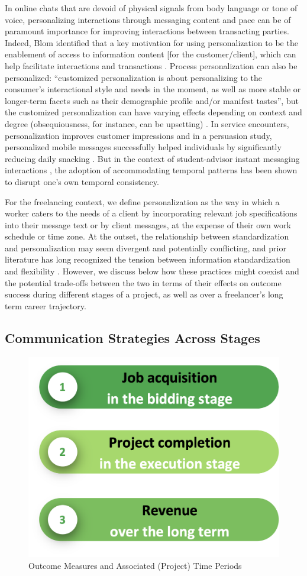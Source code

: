 In online chats that are devoid of physical signals from body language or tone of voice, personalizing interactions through messaging content and pace can be of paramount importance for improving interactions between transacting parties. Indeed, Blom identified that a key motivation for using personalization to be the enablement of access to information content [for the customer/client], which can help facilitate interactions and transactions \cite{Blom_2000}. Process personalization can also be personalized{:} ``customized personalization is about personalizing to the consumer's interactional style and needs in the moment, as well as more stable or longer-term facets such as their demographic profile and/or manifest tastes'', but the customized personalization can have varying effects depending on context and degree (obsequiousness, for instance, can be upsetting) \cite{Churchill_2013}. In service encounters, personalization improves customer impressions \cite{Surprenant1987-sz} and in a persuasion study, personalized mobile messages successfully helped individuals by significantly reducing daily snacking \cite{Kaptein_Markopoulos_Ruyter_Aarts_2015}. But in the context of student-advisor instant messaging interactions \cite{Siqueira2009-md}, the adoption of accommodating temporal patterns has been shown to disrupt one's own temporal consistency. 


For the freelancing context, we define personalization as the way in which a worker caters to the needs of a client by incorporating relevant job specifications into their message text or by client messages, at the expense of their own work schedule or time zone. At the outset, the relationship between standardization and personalization may seem divergent and potentially conflicting, and prior literature has long recognized the tension between information standardization and flexibility \cite{Hanseth1996-ux}. However, we discuss below how these practices might coexist and the potential trade-offs between the two in terms of their effects on outcome success during different stages of a project, as well as over a freelancer's long term career trajectory.

\subsection{{Communication Strategies Across Stages}}

\begin{figure}[h]
    \centering
    \includegraphics[width=.5\linewidth]{Chapters/images/stages.png}
    \caption{Outcome Measures and Associated (Project) Time Periods}
    \label{stages}
\end{figure}

